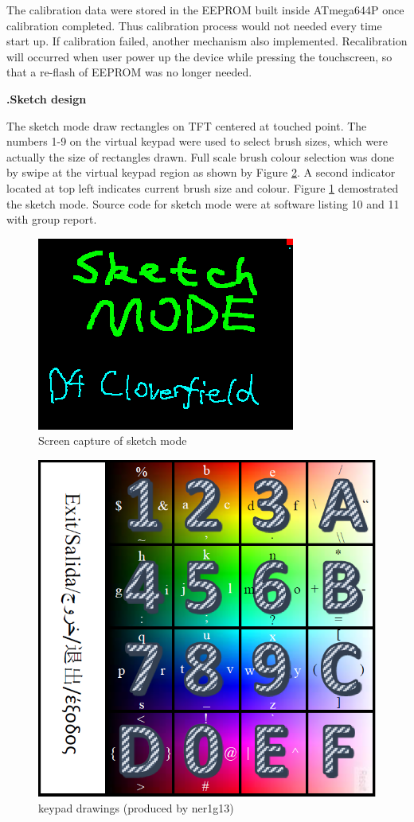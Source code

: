 \documentclass[a4paper,notitlepage,10pt]{report}
\newcommand{\tab}{\hspace{0.75cm}}
\newcommand{\fontSubHeading}{\fontsize{10pt}{11pt}\selectfont}
\newcommand{\fontBody}{\fontsize{10pt}{11pt}\selectfont}
\newcounter{sections}
\newcounter{subsections}[sections]
\begin{document}
\begin{multicols}{2}
The calibration data were stored in the EEPROM built inside ATmega644P once calibration completed. Thus calibration process would not needed every time start up. If calibration failed, another mechanism also implemented. Recalibration will occurred when user power up the device while pressing the touchscreen, so that a re-flash of EEPROM was no longer needed.
\vspace{6pt}

\fontSubHeading
{}
\textbf{\thesections.\thesubsections\tab Sketch design}
\vspace{6pt}

\fontBody
The sketch mode draw rectangles on TFT centered at touched point. The numbers 1-9 on the virtual keypad were used to select brush sizes, which were actually the size of rectangles drawn. Full scale brush colour selection was done by swipe at the virtual keypad region as shown by Figure \ref{fig:keypad}. A second indicator located at top left indicates current brush size and colour. Figure \ref{fig:capSKT} demostrated the sketch mode. Source code for sketch mode were at software listing 10 and 11 with group report.
\vspace{6pt}

\begin{figure}[H]
	\centering
	\includegraphics[width=0.6\columnwidth]{cap_skt}
	\caption{Screen capture of sketch mode}
	\label{fig:capSKT}
\end{figure}
\vspace{6pt}

\begin{figure}[H]
	\centering
	\includegraphics[width=0.6\columnwidth]{keypad}
	\caption{keypad drawings (produced by ner1g13)}
	\label{fig:keypad}
\end{figure}
\vspace{6pt}


\end{multicols}
\end{document}
